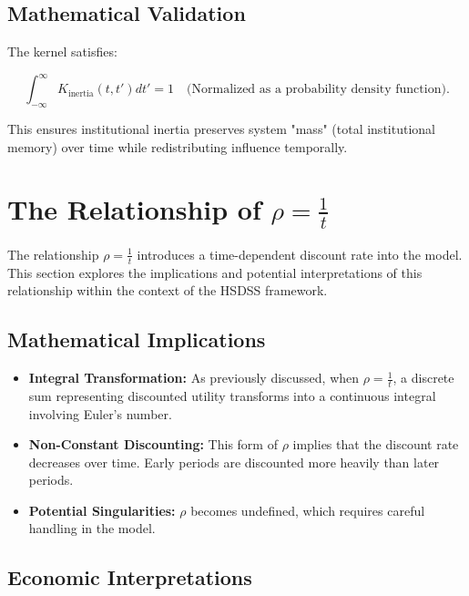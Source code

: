 \documentclass[10pt]{article}
\theoremstyle{definition}
\begin{document}
\subsection{Mathematical Validation}

The kernel satisfies:

\begin{equation}
\int_{-\infty}^{\infty} K_{\text{inertia}}(t, t') dt' = 1 \quad \text{(Normalized as a probability density function)}.
\end{equation}

This ensures institutional inertia preserves system "mass" (total institutional memory) over time while redistributing influence temporally.



\section{The Relationship of \texorpdfstring{$\rho = \frac{1}{t}$}{rho = 1/t}}

The relationship $\rho = \frac{1}{t}$ introduces a time-dependent discount rate into the model. This section explores the implications and potential interpretations of this relationship within the context of the HSDSS framework.

\subsection{Mathematical Implications}

\begin{itemize}
    \item \textbf{Integral Transformation:} As previously discussed, when $\rho = \frac{1}{t}$, a discrete sum representing discounted utility transforms into a continuous integral involving Euler's number.
    \item \textbf{Non-Constant Discounting:} This form of $\rho$ implies that the discount rate decreases over time. Early periods are discounted more heavily than later periods.
    \item \textbf{Potential Singularities:}  $\rho$ becomes undefined, which requires careful handling in the model.
\end{itemize}

\subsection{Economic Interpretations}
\end{document}
